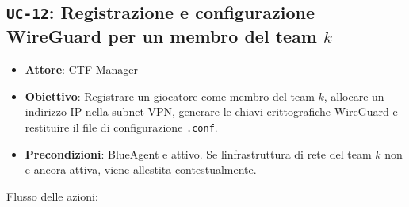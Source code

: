 \subsection{\texorpdfstring{\texttt{UC-12}: Registrazione e
configurazione WireGuard per un membro del team
\(k\)}{UC-12: Registrazione e configurazione WireGuard per un membro del team k}}\label{uc-12-registrazione-e-configurazione-wireguard-per-un-membro-del-team-k}

\begin{itemize}
\tightlist
\item
  \textbf{Attore}: CTF Manager
\item
  \textbf{Obiettivo}: Registrare un giocatore come membro del team
  \(k\), allocare un indirizzo IP nella subnet VPN, generare le chiavi
  crittografiche WireGuard e restituire il file di configurazione
  \passthrough{\lstinline!.conf!}.
\item
  \textbf{Precondizioni}: BlueAgent e\textquotesingle{} attivo. Se
  l\textquotesingle infrastruttura di rete del team \(k\) non
  e\textquotesingle{} ancora attiva, viene allestita contestualmente.
\end{itemize}

Flusso delle azioni:

